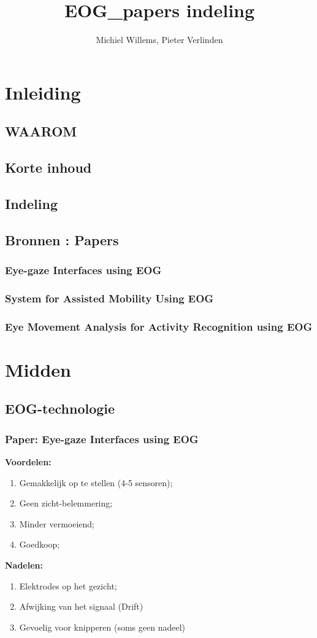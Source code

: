 \documentclass[12pt,a4paper]{article}
\author{Michiel Willems, Pieter Verlinden}
\title{EOG_papers indeling}
\begin{document}
\section{Inleiding}
	\subsection{WAAROM}
	\subsection{Korte inhoud}
	\subsection{Indeling}
	\subsection{Bronnen : Papers}
		\subsubsection{Eye-gaze Interfaces using EOG}
		\subsubsection{System for Assisted Mobility Using EOG}
		\subsubsection{Eye Movement Analysis for Activity Recognition using EOG}
\section{Midden}

	\subsection{EOG-technologie}
		\subsubsection{Paper: Eye-gaze Interfaces using EOG}
			\textbf{Voordelen:}
				\begin{enumerate}
					\item Gemakkelijk op te stellen (4-5 sensoren);
					\item Geen zicht-belemmering;
					\item Minder vermoeiend;
					\item Goedkoop;
				\end{enumerate}
			\textbf{Nadelen:}
				\begin{enumerate}
					\item Elektrodes op het gezicht;
					\item Afwijking van het signaal (Drift)
					\item Gevoelig voor knipperen (soms geen nadeel)
				\end{enumerate}
\end{document}
